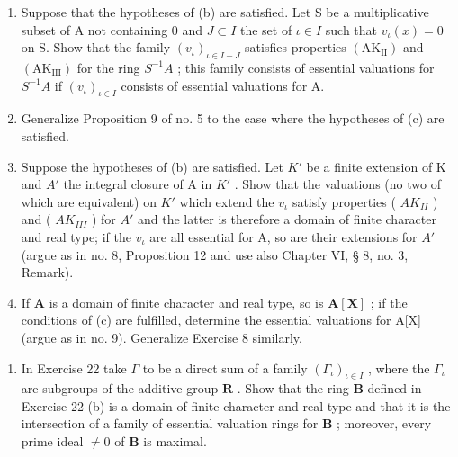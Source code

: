\begin{enumerate}
\item
  Suppose that the hypotheses of (b) are satisfied. Let S be a multiplicative subset of A not containing 0 and \(J \subset I\) the set of \(\iota \in I\) such that \(v_{\iota}(x) = 0\) on S. Show that the family \((v_{\iota})_{\iota \in I-J}\) satisfies properties \((\mathrm{AK}_{\mathrm{II}})\) and \((\mathrm{AK}_{\mathrm{III}})\) for the ring \(S^{-1}A\) ; this family consists of essential valuations for \(S^{-1}A\) if \((v_{\iota})_{\iota \in I}\) consists of essential valuations for A.
\item
  Generalize Proposition 9 of no. 5 to the case where the hypotheses of (c) are satisfied.
\item
  Suppose the hypotheses of (b) are satisfied. Let \(K'\) be a finite extension of K and \(A'\) the integral closure of A in \(K'\) . Show that the valuations (no two of which are equivalent) on \(K'\) which extend the \(v_{\iota}\) satisfy properties ( \(AK_{II}\) ) and ( \(AK_{III}\) ) for \(A'\) and the latter is therefore a domain of finite character and real type; if the \(v_{\iota}\) are all essential for A, so are their extensions for \(A'\) (argue as in no. 8, Proposition 12 and use also Chapter VI, § 8, no. 3, Remark).
\item
  If \(\mathbf{A}\) is a domain of finite character and real type, so is \(\mathbf{A}[\mathbf{X}]\) ; if the conditions of (c) are fulfilled, determine the essential valuations for A{[}X{]} (argue as in no. 9). Generalize Exercise 8 similarly.
\end{enumerate}

\begin{enumerate}
\def\labelenumi{\arabic{enumi}.}
\setcounter{enumi}{26}
\tightlist
\item
  In Exercise 22 take \(\Gamma\) to be a direct sum of a family \((\Gamma_{\iota})_{\iota\in I}\) , where the \(\Gamma_{\iota}\) are subgroups of the additive group \(\mathbf{R}\) . Show that the ring \(\mathbf{B}\) defined in Exercise 22 (b) is a domain of finite character and real type and that it is the intersection of a family of essential valuation rings for \(\mathbf{B}\) ; moreover, every prime ideal \(\neq 0\) of \(\mathbf{B}\) is maximal.
\end{enumerate}

